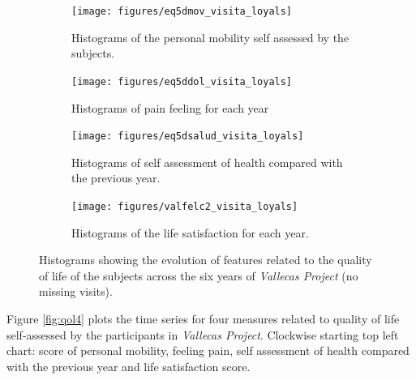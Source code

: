 \documentclass[11pt]{article}
\theoremstyle{definition}
\theoremstyle{remark}
\begin{document}
\begin{figure}[H]
    \centering
    \begin{subfigure}[t]{0.4\textwidth}
        \centering
        \texttt{[image: figures/eq5dmov\_visita\_loyals]}
        \caption{Histograms of the personal mobility self assessed by the subjects.}
    \end{subfigure}
    \hfill
    \begin{subfigure}[t]{0.4\textwidth}
        \centering
        \texttt{[image: figures/eq5ddol\_visita\_loyals]}
        \caption{Histograms of pain feeling for each year}
    \end{subfigure}%
    
     \begin{subfigure}[t]{0.4\textwidth}
        \centering
        \texttt{[image: figures/eq5dsalud\_visita\_loyals]}
        \caption{Histograms of self assessment of health compared with the previous year.}
    \end{subfigure}
    \hfill
    \begin{subfigure}[t]{0.4\textwidth}
        \centering
        \texttt{[image: figures/valfelc2\_visita\_loyals]}
        \caption{Histograms of the life satisfaction for each year.}
    \end{subfigure}%
    \caption{Histograms showing the evolution of features related to the quality of life of the subjects across the six years of \emph{Vallecas Project} (no missing visits).}
    \label{fig:qollong}
\end{figure}

Figure \ref{fig:qol4} plots the time series for four measures related to quality of life self-assessed by the participants in \emph{Vallecas Project}. Clockwise starting top left chart: score of personal mobility, feeling pain, self assessment of health compared with the previous year and life satisfaction score.
\end{document}
